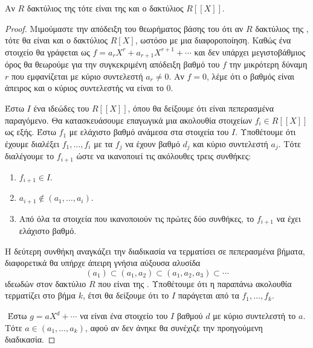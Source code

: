 \begin{lemma} Αν $R$ δακτύλιος της  τότε είναι της  και ο δακτύλιος $R[[X]]$.
\end{lemma}


\begin{proof}
    Μιμούμαστε την απόδειξη του θεωρήματος βάσης του  ότι αν $R$ δακτύλιος της , τότε θα είναι και ο δακτύλιος 
    $R[X]$, ωστόσο με μια διαφοροποίηση. Καθώς ένα στοιχείο θα γράφεται ως $f = a_r X^r + a_{r+1}X^{r+1} + \cdots$ και δεν υπάρχει 
    μεγιστοβάθμιος όρος θα θεωρούμε για την συγκεκριμένη απόδειξη βαθμό του $f$ την μικρότερη δύναμη $r$ που εμφανίζεται με κύριο συντελεστή $a_r \neq 0$. Αν $f=0$, λέμε ότι ο βαθμός είναι άπειρος και ο κύριος συντελεστής να είναι το $0$.

    Έστω $I$ ένα ιδεώδες του $R[[X]]$, όπου θα δείξουμε ότι είναι πεπερασμένα παραγόμενο. Θα κατασκευάσουμε επαγωγικά μια ακολουθία 
    στοιχείων $f_i \in R[[X]]$ ως εξής. Έστω $f_1$ με ελάχιστο βαθμό ανάμεσα στα στοιχεία του $I$. Υποθέτουμε ότι έχουμε διαλέξει $f_1,\ldots, f_i$ με τα $f_j$ να έχουν βαθμό $d_j$ και κύριο συντελεστή $a_j$. Τότε διαλέγουμε το $f_{i+1}$ ώστε να ικανοποιεί τις ακόλουθες τρεις συνθήκες:

    \begin{enumerate}
        \item $f_{i+1} \in I$.
        \item $a_{i+1} \notin (a_1,\ldots,a_i)$.
        \item Από όλα τα στοιχεία που ικανοποιούν τις πρώτες δύο συνθήκες, το $f_{i+1}$ να έχει ελάχιστο βαθμό.
    \end{enumerate}

    \noindent Η δεύτερη συνθήκη αναγκάζει την διαδικασία να τερματίσει σε πεπερασμένα βήματα, διαφορετικά θα υπήρχε άπειρη γνήσια αύξουσα αλυσίδα
    $$(a_1) \subset (a_1,a_2) \subset (a_1,a_2,a_3) \subset \cdots$$ ιδεωδών στον δακτύλιο $R$ που είναι της . Υποθέτουμε ότι η παραπάνω ακολουθία τερματίζει στο βήμα $k$, έτσι θα δείξουμε ότι το $I$ παράγεται από τα $f_1,\ldots, f_k$.
    
    $ $\newline
    Έστω $g = aX^d + \cdots $ να είναι ένα στοιχείο του $I$ βαθμού $d$ με κύριο συντελεστή το $a$. Τότε $a \in (a_1,\ldots,a_k)$, αφού αν δεν άνηκε θα συνέχιζε την προηγούμενη διαδικασία.
    

\end{proof}
